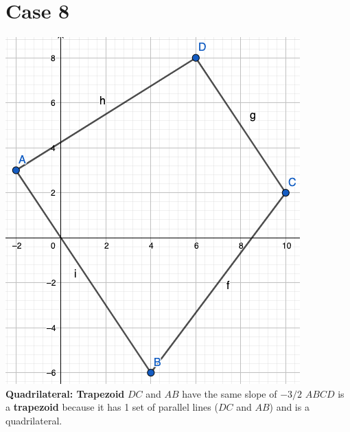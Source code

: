 \documentclass{article}
\begin{document}
	\section*{Case 8}
	\includegraphics[scale=0.35]{pics/Case8} \newline
	\textbf{Quadrilateral: Trapezoid} \newline
	$DC$ and $AB$ have the same slope of $-3/2$ \newline
	$ABCD$ is a \textbf{trapezoid} because it has 1 set of parallel lines ($DC$ and $AB$) and is a quadrilateral. 
\end{document}
